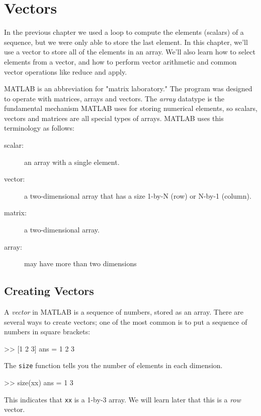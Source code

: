 \chapter{Vectors}
\label{vectors}


In the previous chapter we used a loop to compute the elements (scalars) of a sequence, but we were only able to store the last element.  In this chapter, we'll use a vector to store all of the elements in an array.
We'll also learn how to select elements from a vector, and how to perform vector arithmetic and common vector operations like reduce and apply.

MATLAB is an abbreviation for "matrix laboratory."  The program was designed to operate with matrices, arrays and vectors.  The \emph{array} datatype is the fundamental mechanism MATLAB uses for storing numerical elements, so scalars, vectors and matrices are all special types of arrays.  MATLAB uses this terminology as follows:

\begin{description}
\item[scalar:] an array with a single element.
\item[vector:] a two-dimensional array that has a size 1-by-N (row) or N-by-1 (column).
\item[matrix:] a two-dimensional array.
\item[array:] may have more than two dimensions
\end{description}

\section{Creating Vectors}


A \emph{vector} in MATLAB is a sequence of numbers, stored as an array.
There are several ways to create vectors; one of the most common is
to put a sequence of numbers in square brackets:

\begin{code}
>> [1 2 3]
ans = 1     2     3
\end{code}

The \lstinline{size} function tells you the number of elements in each dimension.

\begin{code}
>> size(xx)
ans =
    1     3
\end{code}
This indicates that \lstinline{xx} is a 1-by-3 array.  We will learn later that this is a \emph{row} vector.


